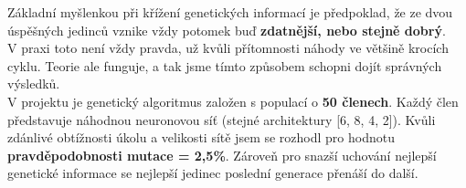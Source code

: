 \documentclass[a4paper,12pt]{article}
\begin{document}
        \vspace{0.75cm}
        Základní myšlenkou při křížení genetických informací je předpoklad, že ze dvou úspěšných
        jedinců vznike vždy potomek buď \textbf{zdatnější, nebo stejně dobrý}.\\
        V praxi toto není vždy pravda, už kvůli přítomnosti náhody ve většině krocích cyklu. 
        Teorie ale funguje, a tak jsme tímto způsobem schopni dojít správných výsledků.
        \\

        V projektu je genetický algoritmus založen s populací o \textbf{50 členech}. 
        Každý člen představuje náhodnou neuronovou síť (stejné architektury [6, 8, 4, 2]).
        Kvůli zdánlivé obtížnosti úkolu a velikosti sítě jsem se rozhodl pro hodnotu 
        \textbf{pravděpodobnosti mutace = 2,5\%}. Zároveň pro snazší uchování nejlepší 
        genetické informace se nejlepší jedinec poslední generace přenáší do další.
        
\end{document}
